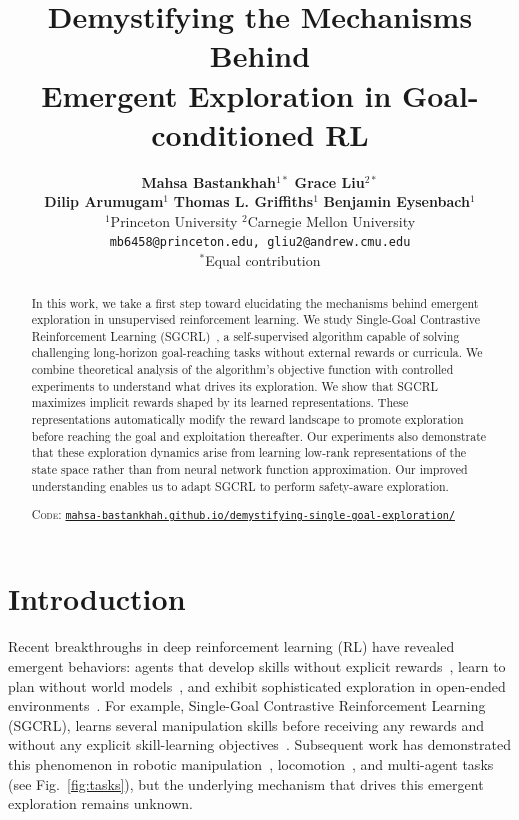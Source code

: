 \documentclass{article}
\title{Demystifying the Mechanisms Behind \\ Emergent Exploration in Goal-conditioned RL}
\author{
\textbf{Mahsa Bastankhah}$^{1*}$ \quad 
\textbf{Grace Liu}$^{2*}$ \\[0.25em]
\textbf{Dilip Arumugam}$^1$ \quad 
\textbf{Thomas L. Griffiths}$^1$ \quad 
\textbf{Benjamin Eysenbach}$^1$ \\[0.5em]
$^1$Princeton University \quad 
$^2$Carnegie Mellon University \\[0.25em]
\texttt{mb6458@princeton.edu, gliu2@andrew.cmu.edu} \\
\hfill \small $^*$Equal contribution
}
\begin{document}
\maketitle

\begin{abstract}
In this work, we take a first step toward elucidating the mechanisms behind emergent exploration in unsupervised reinforcement learning.  We study Single-Goal Contrastive Reinforcement Learning (SGCRL)~\citep{liu2025a}, a self-supervised algorithm capable of solving challenging long-horizon goal-reaching tasks without external rewards or curricula. We combine theoretical analysis of the algorithm's objective function with controlled experiments to understand what drives its exploration.
We show that SGCRL maximizes implicit rewards shaped by its learned representations. These representations automatically modify the reward landscape to promote exploration before reaching the goal and exploitation thereafter. Our experiments also demonstrate that these exploration dynamics arise from learning low-rank representations of the state space rather than from neural network function approximation. Our improved understanding enables us to adapt SGCRL to perform safety-aware exploration.

 \textsc{Code}: \footnotesize \href{https://mahsa-bastankhah.github.io/demystifying-single-goal-exploration/}{\texttt{mahsa-bastankhah.github.io/demystifying-single-goal-exploration/}}
\end{abstract}

\section{Introduction}
Recent breakthroughs in deep reinforcement learning (RL) have revealed emergent behaviors: agents that develop skills without explicit rewards~\citep{liu2025a}, learn to plan without world models~\citep{bush2025interpreting,simmons2025deep}, and exhibit sophisticated exploration in open-ended environments~\citep{team2021open}.
For example, Single-Goal Contrastive Reinforcement Learning (SGCRL), learns several manipulation skills before receiving any rewards and without any explicit skill-learning objectives~\citep{liu2025a}. 
Subsequent work has demonstrated this phenomenon in robotic manipulation~\citep{liu2025a}, locomotion~\citep{bortkiewicz2025accelerating}, and multi-agent tasks~\citep{nimonkar2025selfsupervised} (see Fig.~\ref{fig:tasks}), but the underlying mechanism that drives this emergent exploration remains unknown.
\end{document}
